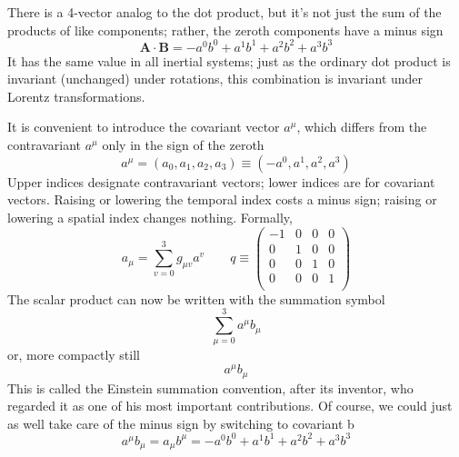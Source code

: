 \documentclass[../../main.tex]{subfiles}
\begin{document}
There is a 4-vector analog to the dot product, but it’s not just the sum of the products of like components; rather, the zeroth components have a minus sign
\begin{equation*}
\mathbf{A}\cdot\mathbf{B}=-a^0b^0+ a^1b^1+ a^2b^2+ a^3b^3
\end{equation*}
It has the same value in all inertial systems; just as the ordinary dot product is invariant (unchanged) under rotations, this combination is invariant under Lorentz transformations. 

It is convenient to introduce the covariant vector $a^\mu$, which differs from the contravariant $a^\mu$ only in the sign of the zeroth
\begin{equation*}
a^\mu= (a_0, a_1, a_2, a_3) \equiv (-a^0, a^1, a^2, a^3)
\end{equation*}
Upper indices designate contravariant vectors; lower indices are for covariant vectors. Raising or lowering the temporal index costs a minus sign; raising or lowering a spatial index changes nothing. Formally,
\begin{equation*}
    a_\mu=\sum_{v=0}^{3}g_{\mu v}a^v\qquad q\equiv
    \begin{pmatrix}
        -1&0&0&0\\
        0&1&0&0\\
        0&0&1&0\\
        0&0&0&1\\
    \end{pmatrix}
\end{equation*}
The scalar product can now be written with the summation symbol
\begin{equation*}
    \sum_{\mu=0}^{3}a^\mu b_\mu
\end{equation*}
or, more compactly still
\begin{equation*}
    a^\mu b_\mu
\end{equation*}
This is called the Einstein summation convention, after its inventor, who regarded it as one of his most important contributions. Of course, we could just as well take care of the minus sign by switching to covariant b
\begin{equation*}
    a^\mu b_\mu = a_\mu b^\mu = -a^0b^0 + a^1b^1 + a^2b^2 + a^3b^3
\end{equation*}
\end{document}
